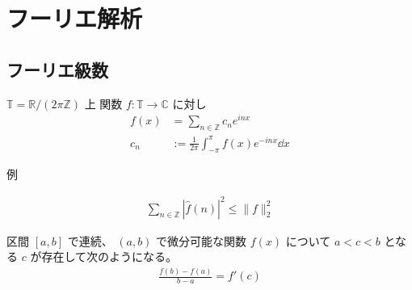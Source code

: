 \documentclass[uplatex,dvipdfmx,a4paper,11pt]{jlreq}
\newcommand{\CC}{\mathbb{C}}
\newcommand{\RR}{\mathbb{R}}
\newcommand{\ZZ}{\mathbb{Z}}
\newcommand{\TT}{\mathbb{T}}
\theoremstyle{definition}
\begin{document}
\section{フーリエ解析}
\subsection{フーリエ級数}
\begin{definition}[複素フーリエ級数]
  $\TT = \RR/(2\pi\ZZ)$ 上 関数 $f: \TT\to\CC$ に対し
  \begin{align}
    f(x) & = \sum_{n\in\ZZ}c_ne^{inx}                          \\
    c_n  & := \frac{1}{2\pi}\int_{-\pi}^\pi f(x)e^{-inx}\dd{x}
  \end{align}
\end{definition}
例
\begin{theorem}
  \begin{align}
    \sum_{n\in\ZZ}|\hat{f}(n)|^2 \leq \|f\|_2^2
  \end{align}
\end{theorem}


\begin{theorem}[平均値の定理]
  区間 $[a, b]$ で連続、 $(a, b)$ で微分可能な関数 $f(x)$ について $a < c < b$ となる $c$ が存在して次のようになる。
  \begin{align}
    \frac{f(b) - f(a)}{b - a} = f'(c)
  \end{align}
\end{theorem}
\end{document}
